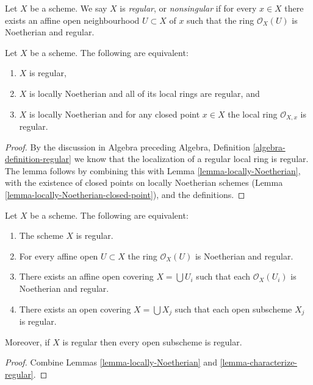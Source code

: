 \begin{definition}
\label{definition-regular}
Let $X$ be a scheme. We say $X$ is {\it regular}, or {\it nonsingular} if
for every $x \in X$ there exists an affine open neighbourhood
$U \subset X$ of $x$ such that the ring $\mathcal{O}_X(U)$ is
Noetherian and regular.
\end{definition}

\begin{lemma}
\label{lemma-characterize-regular}
Let $X$ be a scheme. The following are equivalent:
\begin{enumerate}
\item $X$ is regular,
\item $X$ is locally Noetherian and all of its local rings are regular,
and
\item $X$ is locally Noetherian and for any closed point $x \in X$
the local ring $\mathcal{O}_{X, x}$ is regular.
\end{enumerate}
\end{lemma}

\begin{proof}
By the discussion in Algebra preceding Algebra, Definition
\ref{algebra-definition-regular} we know that the localization of
a regular local ring is regular. The lemma follows
by combining this with Lemma \ref{lemma-locally-Noetherian},
with the existence of closed
points on locally Noetherian schemes
(Lemma \ref{lemma-locally-Noetherian-closed-point}), and
the definitions.
\end{proof}

\begin{lemma}
\label{lemma-locally-regular}
Let $X$ be a scheme. The following are equivalent:
\begin{enumerate}
\item The scheme $X$ is regular.
\item For every affine open $U \subset X$ the ring $\mathcal{O}_X(U)$
is Noetherian and regular.
\item There exists an affine open covering $X = \bigcup U_i$ such that
each $\mathcal{O}_X(U_i)$ is Noetherian and regular.
\item There exists an open covering $X = \bigcup X_j$
such that each open subscheme $X_j$ is regular.
\end{enumerate}
Moreover, if $X$ is regular then every open subscheme is regular.
\end{lemma}

\begin{proof}
Combine Lemmas \ref{lemma-locally-Noetherian}
and \ref{lemma-characterize-regular}.
\end{proof}

